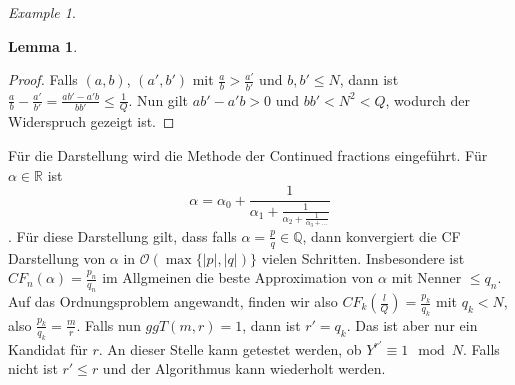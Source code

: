 \documentclass[a4paper, 12pt]{article}
\theoremstyle{plain}
\theoremstyle{definition}
\theoremstyle{lemma}
\newtheorem{lemma}[theorem]{Lemma}
\theoremstyle{remark}
\theoremstyle{example}
\newtheorem{example}[theorem]{Example}
\begin{document}
\begin{example}
\begin{lemma}
		\end{lemma}
		\begin{proof}
			Falls $(a,b)$, $(a',b')$ mit $\frac{a}{b} > \frac{a'}{b'}$ und $b,b' \leq N$, dann ist $\frac{a}{b} - \frac{a'}{b'} = \frac{ab'-a'b}{bb'}\leq \frac{1}{Q}$. Nun gilt $ab'-a'b > 0$ und $bb' < N^2 < Q$, wodurch der Widerspruch gezeigt ist.
		\end{proof}
		Für die Darstellung wird die Methode der Continued fractions eingeführt. Für $\alpha \in \mathbb{R}$ ist $$\alpha = \alpha_0 + \frac{1}{\alpha_1 + \frac{1}{\alpha_2 + \frac{1}{\alpha_3 + ...}}}$$. Für diese Darstellung gilt, dass falls $\alpha = \frac{p}{q} \in \mathbb{Q}$, dann konvergiert die CF Darstellung von $\alpha$ in $\mathcal{O}(\max\{\left|p\right|, \left|q\right|)\}$ vielen Schritten. Insbesondere ist $CF_n(\alpha) = \frac{p_n}{q_n}$ im Allgmeinen die beste Approximation von $\alpha$ mit Nenner $\leq q_n$.\\
		Auf das Ordnungsproblem angewandt, finden wir also $CF_k(\frac{l}{Q}) = \frac{p_k}{q_k}$ mit $q_k < N$, also $\frac{p_k}{q_k} = \frac{m}{r}$. Falls nun $ggT(m,r) = 1$, dann ist $r' = q_k$. Das ist aber nur ein Kandidat für $r$. An dieser Stelle kann getestet werden, ob $Y^{r'} \equiv 1 \mod N$. Falls nicht ist $r' \leq r$ und der Algorithmus kann wiederholt werden.
	\end{example}
\end{document}
